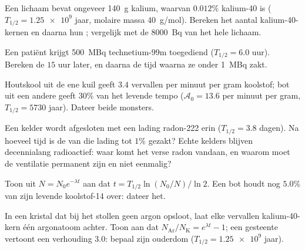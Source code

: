 \begin{exercise}[$\star\star$]\label{exo:g12:radioactive-decay:8}
Een lichaam bevat ongeveer \qty{140}{g} kalium, waarvan $0.012\%$ kalium-40 is
($T_{1/2} = \num{1.25e9}$ jaar, molaire massa \qty{40}{g/mol}). Bereken het
aantal kalium-40-kernen en daarna hun ; vergelijk met de
\qty{8000}{Bq} van het hele lichaam.
\end{exercise}

\begin{exercise}[$\star\star$]\label{exo:g12:radioactive-decay:9}
Een patiënt krijgt \qty{500}{MBq} technetium-99m toegediend ($T_{1/2} = 6.0$
uur). Bereken de  $15$ uur later, en daarna de tijd waarna ze onder
\qty{1}{MBq} zakt.
\end{exercise}

\begin{exercise}[$\star\star$]\label{exo:g12:radioactive-decay:10}
Houtskool uit de ene kuil geeft $3.4$ vervallen per minuut per gram koolstof;
bot uit een andere geeft $30\%$ van het levende tempo
($\mathcal A_0 = 13.6$ per minuut per gram, $T_{1/2} = \num{5730}$ jaar).
Dateer beide monsters.
\end{exercise}

\begin{exercise}[$\star\star$]\label{exo:g12:radioactive-decay:11}
Een kelder wordt afgesloten met een lading radon-222 erin
($T_{1/2} = 3.8$ dagen). Na hoeveel tijd is de  van die lading tot
$1\%$ gezakt? Echte kelders blijven decennialang radioactief: waar komt het
verse radon vandaan, en waarom moet de ventilatie permanent zijn en niet
eenmalig?
\end{exercise}

\begin{exercise}[$\star\star\star$]\label{exo:g12:radioactive-decay:12}
Toon uit $N = N_0 e^{-\lambda t}$ aan dat $t = T_{1/2}\ln(N_0/N)/\ln 2$. Een
bot houdt nog $5.0\%$ van zijn levende koolstof-14 over: dateer het.
\end{exercise}

\begin{exercise}[$\star\star\star$]\label{exo:g12:radioactive-decay:13}
In een kristal dat bij het stollen geen argon opsloot, laat elke vervallen
kalium-40-kern één argonatoom achter. Toon aan dat
$N_{\mathrm{Ar}}/N_{\mathrm K} = e^{\lambda t} - 1$; een gesteente vertoont
een verhouding $3.0$: bepaal zijn ouderdom ($T_{1/2} = \num{1.25e9}$ jaar).
\end{exercise}

